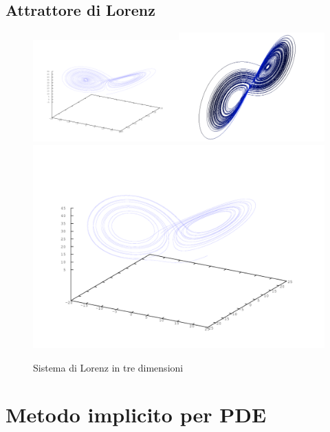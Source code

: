 \documentclass[a4paper,11pt]{report}
\begin{document}
\section{Attrattore di Lorenz}
\begin{figure}[h!]
\centering
\includegraphics[width=0.5\textwidth]{lorenz1}\includegraphics[width=0.5\textwidth]{lorenz}
\includegraphics[width=\textwidth]{lorenz0}
\caption{Sistema di Lorenz in tre dimensioni}
\label{fig:lorenz}
\end{figure}


\chapter{\huge Metodo implicito per PDE}
\end{document}
